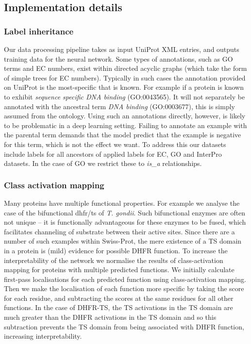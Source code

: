 \subsection*{Implementation details}


\subsubsection*{Label inheritance}
Our data processing pipeline takes as input UniProt XML entries, and outputs training data for the neural network. Some types of annotations, such as GO terms and EC numbers, exist within directed acyclic graphs (which take the form of simple trees for EC numbers). Typically in such cases the annotation provided on UniProt is the most-specific that is known. For example if a protein is known to exhibit \textit{sequence specific DNA binding} (GO:0043565). It will not separately be annotated with the ancestral term \textit{DNA binding} (GO:0003677), this is simply assumed from the ontology. Using such an annotations directly, however, is likely to be problematic in a deep learning setting. Failing to annotate an example with the parental term demands that the model predict that the example is negative for this term, which is not the effect we want.
To address this our datasets include labels for all ancestors of applied labels for EC, GO and InterPro datasets. In the case of GO we restrict these to \textit{is\_a} relationships.

\subsubsection*{Class activation mapping}
Many proteins have multiple functional properties. For example we analyse the case of the bifunctional dhfr/ts of \textit{T. gondii}. Such bifunctional enzymes are often not unique -- it is functionally advantageous for these enzymes to be fused, which facilitates channeling of substrate between their active sites. Since there are a number of such examples within Swiss-Prot, the mere existence of a TS domain in a protein is (mild) evidence for possible DHFR function. To increase the interpretability of the network we normalise the results of class-activation mapping for proteins with multiple predicted functions. We initially calculate first-pass localisations for each predicted function using class-activation mapping. Then we make the localisation of each function more specific by taking the score for each residue, and subtracting the scores at the same residues for all other functions. In the case of DHFR-TS, the TS activations in the TS domain are much greater than the DHFR activations in the TS domain and so this subtraction prevents the TS domain from being associated with DHFR function, increasing interpretability.


